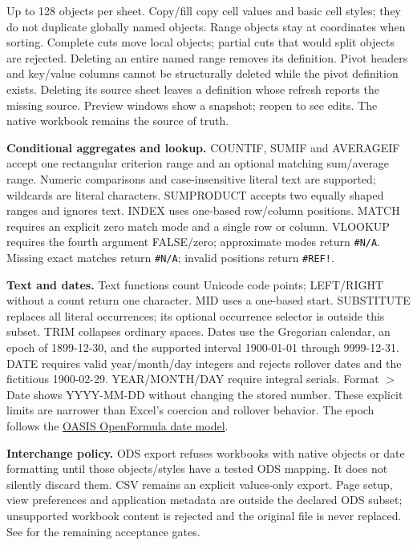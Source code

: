 \documentclass[11pt,letterpaper]{article}
\newcommand{\code}[1]{\texttt{\detokenize{#1}}}
\begin{document}
Up to 128 objects per sheet. Copy/fill copy cell values and basic cell styles;
they do not duplicate globally named objects. Range objects stay at coordinates
when sorting. Complete cuts move local objects; partial cuts that would split
objects are rejected. Deleting an entire named range removes its definition.
Pivot headers and key/value columns cannot be structurally deleted while the
pivot definition exists. Deleting its source sheet leaves a definition whose
refresh reports the missing source. Preview windows show a snapshot; reopen to
see edits. The native workbook remains the source of truth.

\textbf{Conditional aggregates and lookup.} COUNTIF, SUMIF and AVERAGEIF accept
one rectangular criterion range and an optional matching sum/average range.
Numeric comparisons and case-insensitive literal text are supported; wildcards
are literal characters. SUMPRODUCT accepts two equally shaped ranges and ignores
text. INDEX uses one-based row/column positions. MATCH requires an explicit zero
match mode and a single row or column. VLOOKUP requires the fourth argument
FALSE/zero; approximate modes return \texttt{\#N/A}. Missing exact matches return
\texttt{\#N/A}; invalid positions return \texttt{\#REF!}.

\textbf{Text and dates.} Text functions count Unicode code points; LEFT/RIGHT
without a count return one character. MID uses a one-based start. SUBSTITUTE
replaces all literal occurrences; its optional occurrence selector is outside
this subset. TRIM collapses ordinary spaces. Dates use the Gregorian calendar,
an epoch of 1899-12-30, and the supported interval 1900-01-01 through 9999-12-31.
DATE requires valid year/month/day integers and rejects rollover dates and the
fictitious 1900-02-29. YEAR/MONTH/DAY require integral serials. Format $>$ Date
shows YYYY-MM-DD without changing the stored number. These explicit limits are
narrower than Excel's coercion and rollover behavior. The epoch follows the
\href{https://docs.oasis-open.org/office/OpenDocument/v1.3/OpenDocument-v1.3-part4-formula.html}{OASIS OpenFormula date model}.

\textbf{Interchange policy.} ODS export refuses workbooks with native objects or
date formatting until those objects/styles have a tested ODS mapping. It does not
silently discard them. CSV remains an explicit values-only export. Page setup,
view preferences and application metadata are outside the declared ODS subset;
unsupported workbook content is rejected and the original file is never replaced.
See \code{lean_calc/phase-completion.txt} for the remaining acceptance gates.
\end{document}
